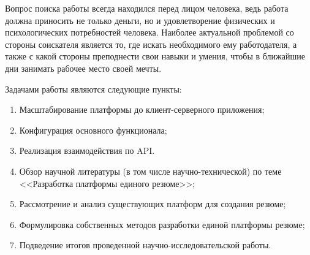 \documentclass[master, och, pract]{SCWorks}
\begin{document}
\secNumbering

\tableofcontents





\intro
Вопрос поиска работы всегда находился перед лицом человека, ведь работа должна 
приносить не только деньги, но и удовлетворение физических и психологических 
потребностей человека. Наиболее актуальной проблемой со стороны соискателя является 
то, где искать необходимого ему работодателя, а также с какой стороны преподнести 
свои навыки и умения, чтобы в ближайшие дни занимать рабочее место своей мечты.


Задачами работы являются следующие пункты:
\begin{enumerate}
    \item Масштабирование платформы до клиент-серверного приложения;
    \item Конфигурация основного функционала; 
    \item Реализация взаимодействия по API.

    \item Обзор научной литературы (в том числе научно-технической) по теме 
    <<Разработка платформы единого резюме>>;
    \item Рассмотрение и анализ существующих платформ для создания резюме;
    \item Формулировка собственных методов разработки единой платформы резюме;
    \item Подведение итогов проведенной научно-исследовательской работы.
\end{enumerate}


\newpage
\end{document}

